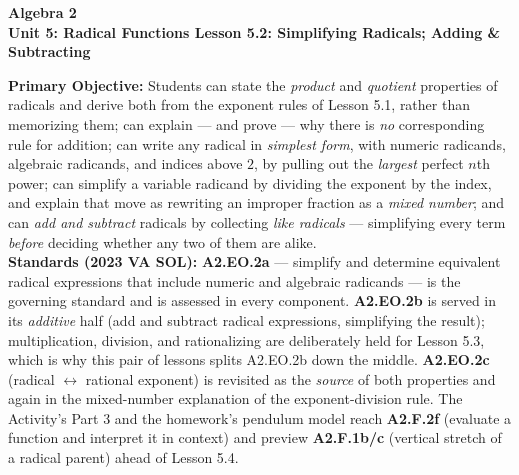 \documentclass[10pt]{article}
\newcommand{\CourseName}{Algebra 2}
\newcommand{\UnitNumberName}{Unit 5: Radical Functions \quad}
\newcommand{\LessonNumberName}{Lesson 5.2: Simplifying Radicals; Adding \& Subtracting}
\begin{document}
\begin{center}
    {\Large\bfseries \CourseName \\
    {\small\bfseries \UnitNumberName \LessonNumberName}}
\end{center}

\begin{tcolorbox}[colback=forestbg, colframe=forest, boxrule=0.9pt, arc=2mm,
    left=2mm, right=2mm, top=1.5mm, bottom=1.5mm]
    \textbf{Primary Objective:} Students can state the \emph{product} and \emph{quotient} properties
    of radicals and derive both from the exponent rules of Lesson 5.1, rather than memorizing them;
    can explain --- and prove --- why there is \emph{no} corresponding rule for addition; can write
    any radical in \emph{simplest form}, with numeric radicands, algebraic radicands, and indices
    above $2$, by pulling out the \emph{largest} perfect $n$th power; can simplify a variable
    radicand by dividing the exponent by the index, and explain that move as rewriting an improper
    fraction as a \emph{mixed number}; and can \emph{add and subtract} radicals by collecting
    \emph{like radicals} --- simplifying every term \emph{before} deciding whether any two of them
    are alike.
    \\[2pt]
    \textbf{Standards (2023 VA SOL):} \textbf{A2.EO.2a} --- simplify and determine equivalent
    radical expressions that include numeric and algebraic radicands --- is the governing standard
    and is assessed in every component. \textbf{A2.EO.2b} is served in its \emph{additive} half
    (add and subtract radical expressions, simplifying the result); multiplication, division, and
    rationalizing are deliberately held for Lesson 5.3, which is why this pair of lessons splits
    A2.EO.2b down the middle. \textbf{A2.EO.2c} (radical $\leftrightarrow$ rational exponent) is
    revisited as the \emph{source} of both properties and again in the mixed-number explanation of
    the exponent-division rule. The Activity's Part 3 and the homework's pendulum model reach
    \textbf{A2.F.2f} (evaluate a function and interpret it in context) and preview
    \textbf{A2.F.1b/c} (vertical stretch of a radical parent) ahead of Lesson 5.4.
\end{tcolorbox}
\end{document}
